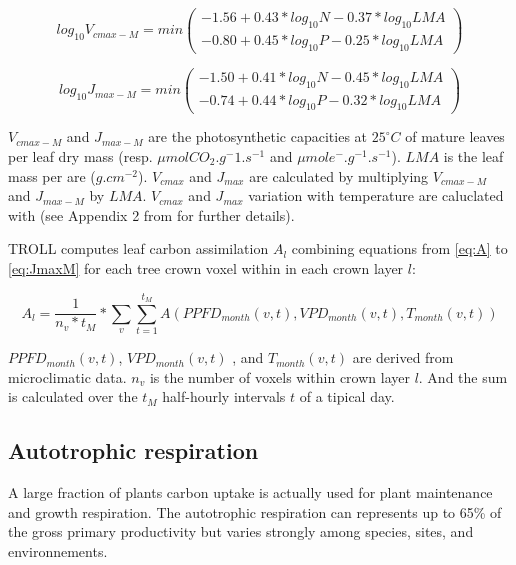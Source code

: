 \documentclass[12pt,]{article}
\theoremstyle{definition}
\theoremstyle{definition}
\theoremstyle{remark}
\begin{document}
\begin{equation}
  log_{10} V_{cmax-M} = min( 
  \begin{array}{c} 
    -1.56+0.43*log_{10} N-0.37*log_{10} LMA \\
    -0.80+0.45*log_{10} P-0.25*log_{10} LMA 
  \end{array} 
  )
  \label{eq:VcmaxM}
\end{equation}

\begin{equation}
  log_{10} J_{max-M} = min(
  \begin{array}{c} 
    -1.50+0.41*log_{10} N-0.45*log_{10} LMA \\
    -0.74+0.44*log_{10} P-0.32*log_{10} LMA 
  \end{array}
  )
  \label{eq:JmaxM}
\end{equation}

\(V_{cmax-M}\) and \(J_{max-M}\) are the photosynthetic capacities at
\(25^\circ C\) of mature leaves per leaf dry mass (resp.
\(\mu mol CO_2.g^-1.s^{-1}\) and \(\mu mol e^-.g^{-1}.s^{-1}\)). \(LMA\)
is the leaf mass per are (\(g.cm^{-2}\)). \(V_{cmax}\) and \(J_{max}\)
are calculated by multiplying \(V_{cmax-M}\) and \(J_{max-M}\) by
\(LMA\). \(V_{cmax}\) and \(J_{max}\) variation with temperature are
caluclated with \citet{Bernacchi2003} (see Appendix 2 from \citet{Li}
for further details).

TROLL computes leaf carbon assimilation \(A_l\) combining equations from
\eqref{eq:A} to \eqref{eq:JmaxM} for each tree crown voxel within in each
crown layer \(l\):

\begin{equation}
  A_l = \frac{1}{n_v*t_M} * \sum_v  \sum^{t_M}_{t=1} A(PPFD_{month}(v,t),VPD_{month}(v,t),T_{month}(v,t))
  \label{eq:Al}
\end{equation}

\(PPFD_{month}(v,t)\), \(VPD_{month}(v,t)\) , and \(T_{month}(v,t)\) are
derived from microclimatic data. \(n_v\) is the number of voxels within
crown layer \(l\). And the sum is calculated over the \(t_M\)
half-hourly intervals \(t\) of a tipical day.

\subsection{Autotrophic respiration}\label{autotrophic-respiration}

A large fraction of plants carbon uptake is actually used for plant
maintenance and growth respiration. The autotrophic respiration can
represents up to 65\% of the gross primary productivity but varies
strongly among species, sites, and environnements.
\end{document}
